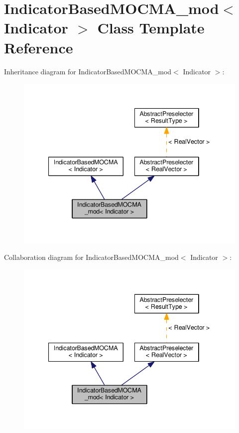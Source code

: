 \hypertarget{classIndicatorBasedMOCMA__mod}{}\section{Indicator\+Based\+M\+O\+C\+M\+A\+\_\+mod$<$ Indicator $>$ Class Template Reference}
\label{classIndicatorBasedMOCMA__mod}


Inheritance diagram for Indicator\+Based\+M\+O\+C\+M\+A\+\_\+mod$<$ Indicator $>$\+:\nopagebreak
\begin{figure}[H]
\begin{center}
\leavevmode
\includegraphics[width=340pt]{classIndicatorBasedMOCMA__mod__inherit__graph}
\end{center}
\end{figure}


Collaboration diagram for Indicator\+Based\+M\+O\+C\+M\+A\+\_\+mod$<$ Indicator $>$\+:\nopagebreak
\begin{figure}[H]
\begin{center}
\leavevmode
\includegraphics[width=340pt]{classIndicatorBasedMOCMA__mod__coll__graph}
\end{center}
\end{figure}
